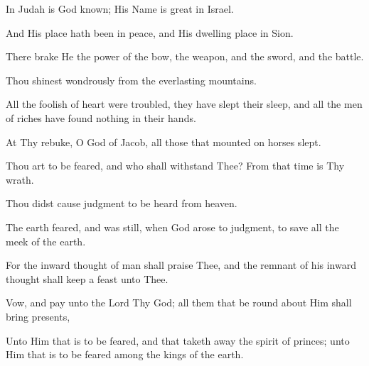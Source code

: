 In Judah is God known; His Name is great in Israel.

And His place hath been in peace, and His dwelling place in Sion.

There brake He the power of the bow, the weapon, and the sword, and the battle.

Thou shinest wondrously from the everlasting mountains.

All the foolish of heart were troubled, they have slept their sleep, and all the men of riches have found nothing in their hands.

At Thy rebuke, O God of Jacob, all those that mounted on horses slept.

Thou art to be feared, and who shall withstand Thee? From that time is Thy wrath.

Thou didst cause judgment to be heard from heaven.

The earth feared, and was still, when God arose to judgment, to save all the meek of the earth.

For the inward thought of man shall praise Thee, and the remnant of his inward thought shall keep a feast unto Thee.

Vow, and pay unto the Lord Thy God; all them that be round about Him shall bring presents,

Unto Him that is to be feared, and that taketh away the spirit of princes; unto Him that is to be feared among the kings of the earth.
